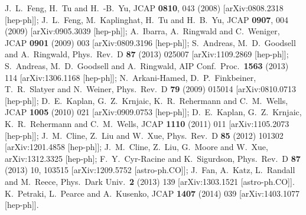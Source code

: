 \documentclass[12pt]{article}
\begin{document}
\begin{thebibliography}{999}
  J.~L.~Feng, H.~Tu and H.~-B.~Yu,
  JCAP {\bf 0810}, 043 (2008)
  [arXiv:0808.2318 [hep-ph]];
  J.~L.~Feng, M.~Kaplinghat, H.~Tu and H.~B.~Yu,
  JCAP {\bf 0907}, 004 (2009)
  [arXiv:0905.3039 [hep-ph]];
  A.~Ibarra, A.~Ringwald and C.~Weniger,
  JCAP {\bf 0901} (2009) 003
  [arXiv:0809.3196 [hep-ph]];
  S.~Andreas, M.~D.~Goodsell and A.~Ringwald,
  Phys.\ Rev.\ D {\bf 87} (2013) 025007
  [arXiv:1109.2869 [hep-ph]];
  S.~Andreas, M.~D.~Goodsell and A.~Ringwald,
  AIP Conf.\ Proc.\  {\bf 1563} (2013) 114
  [arXiv:1306.1168 [hep-ph]];
  N.~Arkani-Hamed, D.~P.~Finkbeiner, T.~R.~Slatyer and N.~Weiner,
  Phys.\ Rev.\ D {\bf 79} (2009) 015014
  [arXiv:0810.0713 [hep-ph]];
   D.~E.~Kaplan, G.~Z.~Krnjaic, K.~R.~Rehermann and C.~M.~Wells,
  JCAP {\bf 1005} (2010) 021
  [arXiv:0909.0753 [hep-ph]];
  D.~E.~Kaplan, G.~Z.~Krnjaic, K.~R.~Rehermann and C.~M.~Wells,
  JCAP {\bf 1110} (2011) 011
  [arXiv:1105.2073 [hep-ph]];
  J.~M.~Cline, Z.~Liu and W.~Xue,
  Phys.\ Rev.\ D {\bf 85} (2012) 101302
  [arXiv:1201.4858 [hep-ph]];
  J.~M.~Cline, Z.~Liu, G.~Moore and W.~Xue,
  arXiv:1312.3325 [hep-ph];
  F.~Y.~Cyr-Racine and K.~Sigurdson,
  Phys.\ Rev.\ D {\bf 87} (2013) 10,  103515
  [arXiv:1209.5752 [astro-ph.CO]];
  J.~Fan, A.~Katz, L.~Randall and M.~Reece,
  Phys.\ Dark Univ.\  {\bf 2} (2013) 139
  [arXiv:1303.1521 [astro-ph.CO]].
   K.~Petraki, L.~Pearce and A.~Kusenko,
  JCAP {\bf 1407} (2014) 039
  [arXiv:1403.1077 [hep-ph]].
  

\end{thebibliography}
\end{document}
